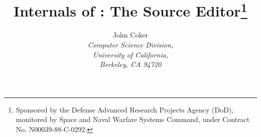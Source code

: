 



\def\EMACS{{\small EMACS}}
\def\UNIX{{\small UNIX}}
\def\ASCII{{\small ASCII}}
\def\WYSIWYG{{\small WYSIWYG}}

\def\bsl{{\tt\char92}}
\def\_{{\tt\char95}}
\def\{{{\tt\char123}}
\def\}{{\tt\char125}}

\def\tbox{{\em t\/}-box}
\def\nbox{{\em n\/}-box}
\def\IRS{IR\lower2pt\hbox{\small S}}
\def\IRT{IR\lower2pt\hbox{\small T}}
\def\IRI{IR\lower2pt\hbox{\small I}}

\title{Internals of \VorTeX: The Source Editor\thanks{Sponsored
by the Defense Advanced Research Projects Agency (DoD),
monitored by Space and Naval Warfare Systems Command,
under Contract No. N00039-88-C-0292.}}

\author{John Coker\\
\em Computer Science Division,\\
University of California,\\
Berkeley, CA 94720}



\maketitle
\pagestyle{regular}












